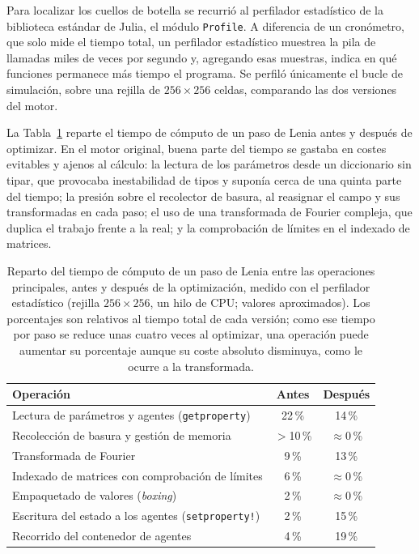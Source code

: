 \documentclass[runningheads]{llncs}
\begin{document}
Para localizar los cuellos de botella se recurrió al perfilador estadístico de la biblioteca estándar de Julia, el módulo \texttt{Profile}. A diferencia de un cronómetro, que solo mide el tiempo total, un perfilador estadístico muestrea la pila de llamadas miles de veces por segundo y, agregando esas muestras, indica en qué funciones permanece más tiempo el programa. Se perfiló únicamente el bucle de simulación, sobre una rejilla de $256\times256$ celdas, comparando las dos versiones del motor.

La Tabla~\ref{tab:profiling_lenia} reparte el tiempo de cómputo de un paso de Lenia antes y después de optimizar. En el motor original, buena parte del tiempo se gastaba en costes evitables y ajenos al cálculo: la lectura de los parámetros desde un diccionario sin tipar, que provocaba inestabilidad de tipos y suponía cerca de una quinta parte del tiempo; la presión sobre el recolector de basura, al reasignar el campo y sus transformadas en cada paso; el uso de una transformada de Fourier compleja, que duplica el trabajo frente a la real; y la comprobación de límites en el indexado de matrices.

\begin{table}[H]
\centering
\caption{Reparto del tiempo de cómputo de un paso de Lenia entre las operaciones principales, antes y después de la optimización, medido con el perfilador estadístico (rejilla $256\times256$, un hilo de CPU; valores aproximados). Los porcentajes son relativos al tiempo total de cada versión; como ese tiempo por paso se reduce unas cuatro veces al optimizar, una operación puede aumentar su porcentaje aunque su coste absoluto disminuya, como le ocurre a la transformada.}
\label{tab:profiling_lenia}
{\small
\begin{tabular}{@{}lcc@{}}
\toprule
\textbf{Operación} & \textbf{Antes} & \textbf{Después} \\ \midrule
Lectura de parámetros y agentes (\texttt{getproperty}) & 22\,\% & 14\,\% \\
Recolección de basura y gestión de memoria & $>$10\,\% & $\approx$0\,\% \\
Transformada de Fourier & 9\,\% & 13\,\% \\
Indexado de matrices con comprobación de límites & 6\,\% & $\approx$0\,\% \\
Empaquetado de valores (\textit{boxing}) & 2\,\% & $\approx$0\,\% \\
Escritura del estado a los agentes (\texttt{setproperty!}) & 2\,\% & 15\,\% \\
Recorrido del contenedor de agentes & 4\,\% & 19\,\% \\ \bottomrule
\end{tabular}
}
\end{table}
\end{document}
